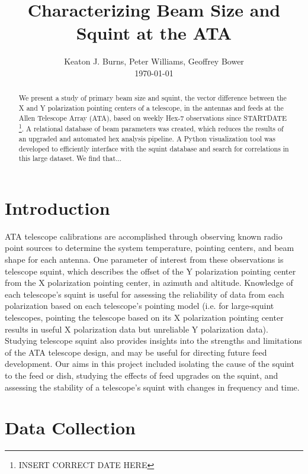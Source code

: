 \documentclass[preprint]{aastex}
\begin{document}
\title{Characterizing Beam Size and Squint at the ATA}
\author{Keaton J. Burns, Peter Williams, Geoffrey Bower \\ \today}

\begin{abstract}
We present a study of primary beam size and squint, the vector difference between the X and Y polarization pointing centers of a telescope, in the antennas and feeds at the Allen Telescope Array (ATA), based on weekly Hex-7 observations since STARTDATE \footnote{INSERT CORRECT DATE HERE}.  A relational database of beam parameters was created, which reduces the results of an upgraded and automated hex analysis pipeline.  A Python visualization tool was developed to efficiently interface with the squint database and search for correlations in this large dataset.  We find that...
\end{abstract}

%
%

\tableofcontents

\section{Introduction}\label{s.intro}
ATA telescope calibrations are accomplished through observing known radio point sources to determine the system temperature, pointing centers, and beam shape for each antenna.  One parameter of interest from these observations is telescope squint, which describes the offset of the Y polarization pointing center from the X polarization pointing center, in azimuth and altitude.  Knowledge of each telescope's squint is useful for assessing the reliability of data from each polarization based on each telescope's pointing model (i.e. for large-squint telescopes, pointing the telescope based on its X polarization pointing center results in useful X polarization data but unreliable Y polarization data). Studying telescope squint also provides insights into the strengths and limitations of the ATA telescope design, and may be useful for directing future feed development.  Our aims in this project included isolating the cause of the squint to the feed or dish, studying the effects of feed upgrades on the squint, and assessing the stability of a telescope's squint with changes in frequency and time.

\section{Data Collection}\label{s.datacollection}
\end{document}
